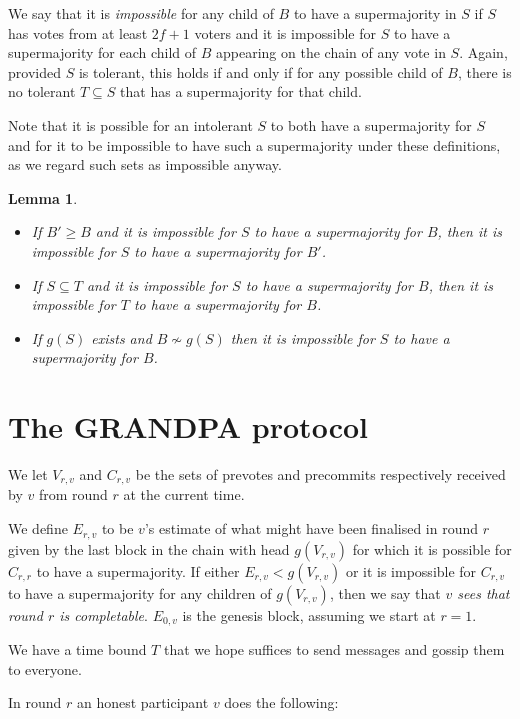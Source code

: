 \documentclass{article}
\newtheorem{lemma}[theorem]{Lemma}
\begin{document}
We say that it is {\em impossible} for any child of $B$ to have a supermajority in $S$ if $S$ has votes from at least $2f+1$ voters and it is impossible for $S$ to have a supermajority for each child of $B$ appearing on the chain of any vote in $S$.
Again, provided $S$ is tolerant, this holds if and only if for any possible child of $B$, there is no tolerant $T \subseteq S$ that has a supermajority for that child.

Note that it is possible for an intolerant $S$ to both have a supermajority for $S$ and for it to be impossible to have such a supermajority under these definitions, as we regard such sets as impossible anyway.

\begin{lemma} \label{lem:impossible}
\begin{itemize}
\item[(i)] If $B' \geq B$ and it is impossible for $S$ to have a supermajority for $B$, then it is impossible for $S$ to have a supermajority for $B'$.
\item[(ii)] If $S \subseteq T$ and it is impossible for $S$ to have a supermajority for $B$, then it is impossible for $T$ to have a supermajority for $B$.
\item[(iii)] If $g(S)$ exists and $B \nsim g(S)$ then it is impossible for $S$ to have a supermajority for $B$.
\end{itemize}
\end{lemma}

\section{The GRANDPA protocol}

We let $V_{r,v}$ and $C_{r,v}$ be the sets of prevotes and precommits respectively received by $v$ from round $r$ at the current time.

We define $E_{r,v}$ to be $v$'s estimate of what might have been finalised in round $r$ given by the last block in the chain with head $g(V_{r,v})$ for which it is possible for $C_{r,r}$ to have a supermajority.
If either $E_{r,v} < g(V_{r,v})$ or it is impossible for $C_{r,v}$ to have a supermajority for any children of $g(V_{r,v})$, then we say that {\em $v$ sees that round $r$ is completable}. $E_{0,v}$ is the genesis block, assuming we start at $r=1$.

We have a time bound $T$ that we hope suffices to send messages and gossip them to everyone. 

In round $r$ an honest participant $v$ does the following:
\end{document}
